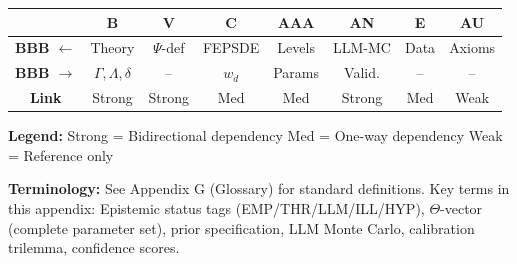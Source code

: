 \documentclass[11pt,a4paper]{article}
\theoremstyle{definition}
\begin{document}
\begin{tcolorbox}[colback=gray!5!white, colframe=gray!75!black, 
    title=\textbf{Cross-Reference Map}]

\begin{center}
\small
\begin{tabular}{@{}c|ccccccc@{}}
\toprule
& \textbf{B} & \textbf{V} & \textbf{C} & \textbf{AAA} & \textbf{AN} & \textbf{E} & \textbf{AU} \\
\midrule
\textbf{BBB $\leftarrow$} & Theory & $\Psi$-def & FEPSDE & Levels & LLM-MC & Data & Axioms \\
\textbf{BBB $\rightarrow$} & $\Gamma,\Lambda,\delta$ & -- & $w_d$ & Params & Valid. & -- & -- \\
\midrule
\textbf{Link} & \cellcolor{red!20}Strong & \cellcolor{red!20}Strong & \cellcolor{yellow!20}Med & \cellcolor{yellow!20}Med & \cellcolor{red!20}Strong & \cellcolor{yellow!20}Med & \cellcolor{green!20}Weak \\
\bottomrule
\end{tabular}
\end{center}

\textbf{Legend:} 
\colorbox{red!20}{Strong} = Bidirectional dependency \quad
\colorbox{yellow!20}{Med} = One-way dependency \quad
\colorbox{green!20}{Weak} = Reference only

\end{tcolorbox}


\begin{tcolorbox}[colback=gray!5!white, colframe=gray!50!black]
\textbf{Terminology:} See Appendix G (Glossary) for standard definitions.
Key terms in this appendix: Epistemic status tags (EMP/THR/LLM/ILL/HYP),
$\Theta$-vector (complete parameter set), prior specification,
LLM Monte Carlo, calibration trilemma, confidence scores.
\end{tcolorbox}
\end{document}
